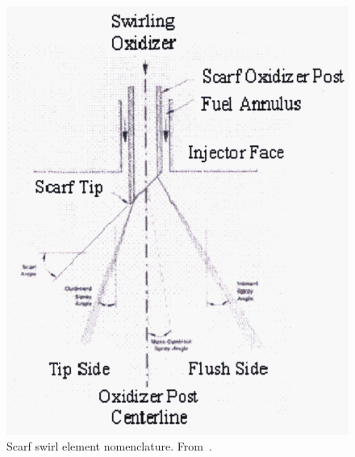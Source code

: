 \begin{figure}[H]
    \centering
    \includegraphics[width=\linewidth]{figs/CCL/fig14.png}
    \caption{Scarf swirl element nomenclature. From~\cite{jones2006local}.}
    \label{fig:enter-label}
\end{figure}
